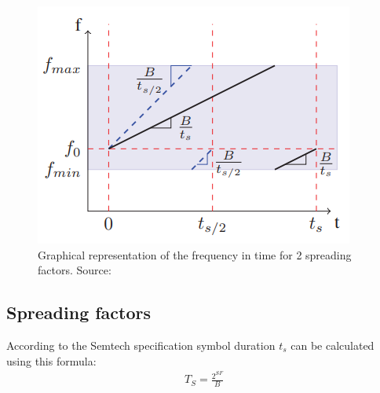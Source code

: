 \begin{figure}[H]
  \centering
  \includegraphics[scale=0.5]{figures/slope.PNG}
  \caption{Graphical representation of the frequency in time for 2 spreading factors. Source: \cite{slope_diagram}}
  \label{fig:slope}
\end{figure}





\subsection{Spreading factors}

According to the Semtech specification \cite{semtech_spec} symbol duration $t_s$ can be calculated using this formula:
\begin{align}
    T_S = \frac{2^{SF}}{B} 
\end{align}

